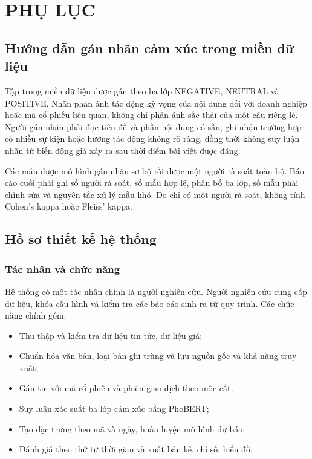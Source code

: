 \chapter{PHỤ LỤC}
\label{ch:phu-luc}

\section{Hướng dẫn gán nhãn cảm xúc trong miền dữ liệu}

Tập trong miền dữ liệu được gán theo ba lớp NEGATIVE, NEUTRAL và POSITIVE. Nhãn phản ánh tác
động kỳ vọng của nội dung đối với doanh nghiệp hoặc mã cổ phiếu liên quan, không chỉ
phản ánh sắc thái của một câu riêng lẻ. Người gán nhãn phải đọc tiêu đề và phần nội
dung có sẵn, ghi nhận trường hợp có nhiều sự kiện hoặc hướng tác động không rõ ràng,
đồng thời không suy luận nhãn từ biến động giá xảy ra sau thời điểm bài viết được
đăng.

Các mẫu được mô hình gán nhãn sơ bộ rồi được một người rà soát toàn bộ. Báo cáo cuối
phải ghi số người rà soát, số mẫu hợp lệ, phân bố ba lớp, số mẫu phải chỉnh sửa và
nguyên tắc xử lý mẫu khó. Do chỉ có một người rà soát, không tính Cohen's kappa hoặc
Fleiss' kappa.

\section{Hồ sơ thiết kế hệ thống}

\subsection{Tác nhân và chức năng}

Hệ thống có một tác nhân chính là người nghiên cứu. Người nghiên cứu cung cấp dữ liệu,
khóa cấu hình và kiểm tra các báo cáo sinh ra từ quy trình. Các chức năng chính gồm:

\begin{itemize}[nosep]
  \item Thu thập và kiểm tra dữ liệu tin tức, dữ liệu giá;
  \item Chuẩn hóa văn bản, loại bản ghi trùng và lưu nguồn gốc và khả năng truy xuất;
  \item Gán tin với mã cổ phiếu và phiên giao dịch theo mốc cắt;
  \item Suy luận xác suất ba lớp cảm xúc bằng PhoBERT;
  \item Tạo đặc trưng theo mã và ngày, huấn luyện mô hình dự báo;
  \item Đánh giá theo thứ tự thời gian và xuất bản kê, chỉ số, biểu đồ.
\end{itemize}

